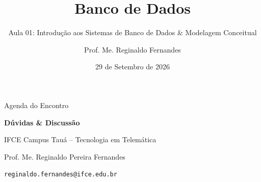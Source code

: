 \documentclass[aspectratio=169,utf8,t]{beamer}
\author{Prof. Me. Reginaldo Fernandes}
\institute{Instituto Federal do Ceará -- Campus Tauá \\ Tecnologia em Telemática}
\title{Banco de Dados}
\subtitle{Aula 01: Introdução aos Sistemas de Banco de Dados \& Modelagem Conceitual}
\date{29 de Setembro de 2026}
\begin{document}
\frame[plain]{\titlepage}

\begin{frame}{Agenda do Encontro}
  \vspace{0.4cm}
  \tableofcontents
\end{frame}









\begin{frame}[plain]
  \vspace{2cm}
  \centering
  {\Huge \textbf{Dúvidas \& Discussão}}\par
  \vspace{0.8cm}
  {\large IFCE Campus Tauá -- Tecnologia em Telemática}\par
  \vspace{0.3cm}
  {\small Prof. Me. Reginaldo Pereira Fernandes}\par
  {\scriptsize \texttt{reginaldo.fernandes@ifce.edu.br}}
\end{frame}
\end{document}
